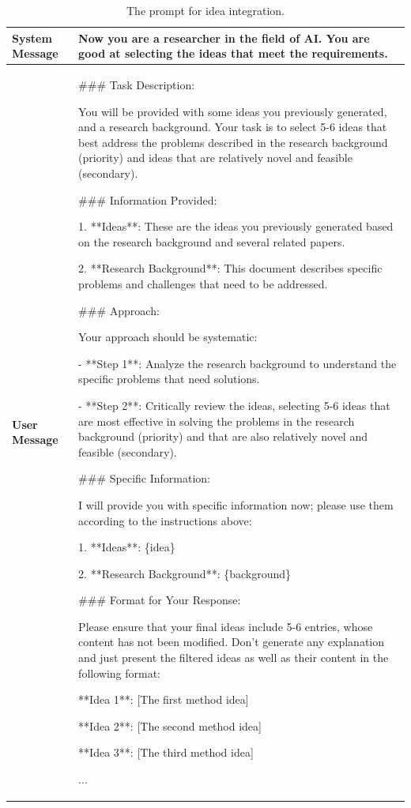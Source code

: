 \documentclass{article}
\theoremstyle{plain}
\theoremstyle{definition}
\theoremstyle{remark}
\begin{document}
\begin{table}[t]
	\centering  %
	\caption{The prompt for idea integration.}  %
	\label{tab:if}  %
	\begin{tabular}{l | m{}}  
		\toprule  %
            \textbf{System Message} & Now you are a researcher in the field of AI. You are good at selecting the ideas that meet the requirements. \\
            \midrule
            \textbf{User Message} & \#\#\# Task Description: 
            
You will be provided with some ideas you previously generated, and a research background. Your task is to select 5-6 ideas that best address the problems described in the research background (priority) and ideas that are relatively novel and feasible (secondary).

\#\#\# Information Provided:

1. **Ideas**: These are the ideas you previously generated based on the research background and several related papers.

2. **Research Background**: This document describes specific problems and challenges that need to be addressed.

\#\#\# Approach:

Your approach should be systematic:

- **Step 1**: Analyze the research background to understand the specific problems that need solutions.

- **Step 2**: Critically review the ideas, selecting 5-6 ideas that are most effective in solving the problems in the research background (priority) and that are also relatively novel and feasible (secondary).

\#\#\# Specific Information:

I will provide you with specific information now; please use them according to the instructions above:

1. **Ideas**: \{idea\}

2. **Research Background**: \{background\}

\#\#\# Format for Your Response:

Please ensure that your final ideas include 5-6 entries, whose content has not been modified. Don't generate any explanation and just present the filtered ideas as well as their content in the following format:

**Idea 1**: [The first method idea]  

**Idea 2**: [The second method idea]  

**Idea 3**: [The third method idea]  

...\\
		\bottomrule
	\end{tabular}
\end{table}
\end{document}
